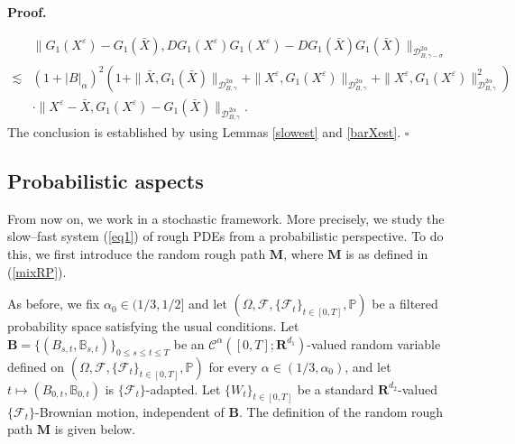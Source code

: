 \documentclass[10pt,a4paper]{article}
\numberwithin{equation}{section}
\newenvironment{proof}[1][\normalfont\bfseries Proof]{%
	\noindent #1.\hspace{0.5em}%
	\ignorespaces%
}{%
	\hfill $\square$%
	\par%
}
\begin{document}
\begin{proof}
	\begin{align*}
	&\|G_1(X^\varepsilon)-G_1(\bar{X}),DG_1(X^\varepsilon)G_1(X^\varepsilon)-DG_1(\bar{X})G_1(\bar{X})\|_{\mathcal{D}_{B,\gamma-\sigma}^{2\alpha} }  \nonumber\\
	\lesssim & (1+|B|_\alpha)^2 \left(1+\|\bar{X},G_1(\bar{X})\|_{\mathcal{D}_{B,\gamma}^{2\alpha}}+\|X^\varepsilon,G_1(X^\varepsilon)\|_{\mathcal{D}_{B,\gamma}^{2\alpha}} +\|X^\varepsilon,G_1(X^\varepsilon)\|_{\mathcal{D}_{ B,\gamma}^{2\alpha}}^2 \right) \nonumber\\
	& \cdot \|X^\varepsilon-\bar{X},G_1(X^\varepsilon)-G_1(\bar{X}) \|_{\mathcal{D}_{B,\gamma}^{2\alpha}}.	
	\end{align*}
The conclusion is established by using Lemmas \ref{slowest} and \ref{barXest}.	
	\end{proof}
	
	
	



























\subsection{Probabilistic aspects} \label{proba}


From now on, we work in a stochastic framework.
More precisely, we study the slow--fast system (\ref{eq1}) of rough PDEs from a probabilistic perspective.
To do this, we first introduce the random rough path $\mathbf M$, where $\mathbf M$ is as defined in (\ref{mixRP}).





As before, we fix $\alpha_0 \in (1/3,1/2]$ and let $(\Omega, \mathcal{F}, \{\mathcal{F}_t\}_{t \in [0, T]},\mathbb{P})$ be a filtered probability space satisfying the usual conditions.
Let
$\mathbf B=\{(B_{s,t}, \mathbb B_{s,t})\}_{0\leq s\leq t\leq T}$ be an $\mathscr{C}^{\alpha}([0,T];\mathbf{R}^{d_1})$-valued random variable defined on $(\Omega, \mathcal{F}, \{\mathcal{F}_t\}_{t \in [0, T]}, \mathbb{P})$ for every $\alpha \in (1/3, \alpha_0)$,
and let $t\mapsto (B_{0,t}, \mathbb B_{0,t})$ is $\{\mathcal{F}_t\}$-adapted.
Let $\{W_t\}_{t\in [0,T]}$ be a standard $\mathbf R^{d_2}$-valued $\{\mathcal{F}_t\}$-Brownian motion, independent of $\mathbf B$.
The definition of the random rough path $\mathbf M$ is given below.
\end{document}
